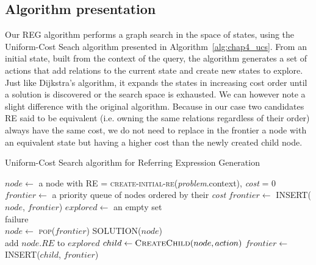 \subsection{Algorithm presentation}

Our REG algorithm performs a graph search in the space of states, using the Uniform-Cost Seach algorithm presented in Algorithm~\ref{alg:chap4_ucs}.
From an initial state, built from the context of the query, the algorithm generates a set of actions that add relations to the current state and create new states to explore. Just like Dijkstra's algorithm, it expands the states in increasing cost order until a solution is discovered or the search space is exhausted. We can however note a slight difference with the original algorithm. Because in our case two candidates RE said to be equivalent (i.e. owning the same relations regardless of their order) always have the same cost, we do not need to replace in the frontier a node with an equivalent state but having a higher cost than the newly created child node.

\begin{algorithm}[!htbp]
\caption{Uniform-Cost Search algorithm for Referring Expression Generation}
\label{alg:chap4_ucs}
\begin{algorithmic}
    \State $node\leftarrow$ a node with RE = \textsc{create-initial-re}(\textit{problem}.context), \textit{cost} = 0
    \State $frontier\leftarrow$ a priority queue of nodes ordered by their \textit{cost}
    \State $frontier\leftarrow$ \textsc{INSERT}($node$, $frontier$)
    \State $explored\leftarrow$ an empty set
    \\
    \Loop
        	\State \Return failure
        \EndIf
        \\
        \State $node\leftarrow$ \textsc{pop}($frontier$)
        	\State \Return \textsc{SOLUTION}($node$)
        \EndIf
        \\
        \State add $node.RE$ to $explored$
            \State $child \leftarrow \textsc{CreateChild}(node, action)$
            	\State $frontier\leftarrow$ \textsc{INSERT}($child$, $frontier$)
            \EndIf
        \EndFor
    \EndLoop
\EndFunction
\end{algorithmic}
\end{algorithm}

